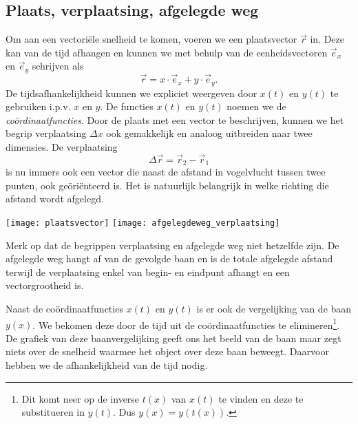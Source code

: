 \documentclass{ximera}
\begin{document}
	\author{Bart Lambregs}
    \xmsource\xmuitleg





	\subsection{Plaats, verplaatsing, afgelegde weg}
	
	Om aan een vectoriële snelheid te komen, voeren we een plaatsvector $\vec{r}$ in. Deze kan van de tijd afhangen en kunnen we met behulp van de eenheidsvectoren $\vec{e}_x$ en $\vec{e}_y$ schrijven als
	\begin{equation*}
	 \vec{r}=x\cdot\vec{e}_x+y\cdot\vec{e}_y.
	\end{equation*}
	De tijdsafhankelijkheid kunnen we expliciet weergeven door $x(t)$ en $y(t)$ te gebruiken i.p.v. $x$ en $y$. De functies $x(t)$ en $y(t)$ noemen we de \emph{coördinaat\-functies}. Door de plaats met een vector te beschrijven, kunnen we het begrip verplaatsing $\Delta x$ ook gemakkelijk en analoog uitbreiden naar twee dimensies. De verplaatsing
	\begin{equation*}
	\Delta\vec{r}=\vec{r}_2-\vec{r}_1
	\end{equation*}
	is nu immers ook een vector die naast de afstand in vogelvlucht tussen twee punten, ook ge\"oriënteerd is. Het is natuurlijk belangrijk in welke richting die afstand wordt afgelegd.
	\begin{image}
	
	\texttt{[image: plaatsvector]}
	\texttt{[image: afgelegdeweg\_verplaatsing]}
	\end{image}
	Merk op dat de begrippen verplaatsing en afgelegde weg niet hetzelfde zijn. De afgelegde weg hangt af van de gevolgde baan en is de totale afgelegde afstand terwijl de verplaatsing enkel van begin- en eindpunt afhangt en een vectorgrootheid is.
	
	Naast de coördinaatfuncties $x(t)$ en $y(t)$ is er ook de vergelijking van de baan $y(x)$. We bekomen deze door de tijd uit de coördinaatfuncties te elimineren\footnote{Dit komt neer op de inverse $t(x)$ van $x(t)$ te vinden en deze te substitueren in $y(t)$. Dus $y(x)=y(t(x))$.}. De grafiek van deze baanvergelijking geeft ons het beeld van de baan maar zegt niets over de snelheid waarmee het object over deze baan beweegt. Daarvoor hebben we de afhankelijkheid van de tijd nodig.
	
\end{document}
